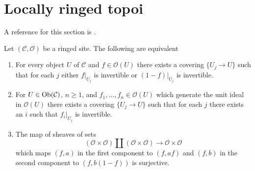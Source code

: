 \section{Locally ringed topoi}
\label{section-locally-ringed}


\noindent
A reference for this section is
\cite[Expos\'e IV, Exercice 13.9]{SGA4}.

\begin{lemma}
\label{lemma-locally-ringed}
Let $(\mathcal{C}, \mathcal{O})$ be a ringed site. The following
are equivalent
\begin{enumerate}
\item For every object $U$ of $\mathcal{C}$ and $f \in \mathcal{O}(U)$
there exists a covering $\{U_j \to U\}$ such that for each $j$
either $f|_{U_j}$ is invertible or $(1 - f)|_{U_j}$ is invertible.
\item For $U \in \mathop{\mathrm{Ob}}\nolimits(\mathcal{C})$, $n \geq 1$, and
$f_1, \ldots, f_n \in \mathcal{O}(U)$ which generate the unit ideal
in $\mathcal{O}(U)$ there exists a covering $\{U_j \to U\}$
such that for each $j$ there exists an $i$ such that $f_i|_{U_j}$
is invertible.
\item The map of sheaves of sets
$$
(\mathcal{O} \times \mathcal{O})
\amalg
(\mathcal{O} \times \mathcal{O})
\longrightarrow
\mathcal{O} \times \mathcal{O}
$$
which maps $(f, a)$ in the first component to $(f, af)$ and
$(f, b)$ in the second component to $(f, b(1 - f))$ is surjective.
\end{enumerate}
\end{lemma}

